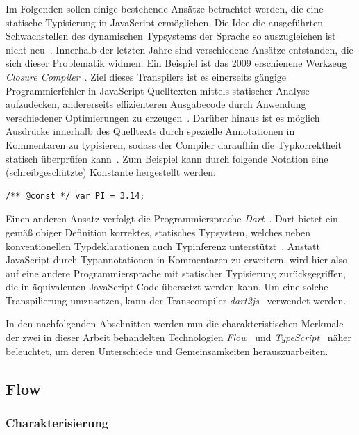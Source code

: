 Im Folgenden sollen einige bestehende Ansätze betrachtet werden, die eine statische Typisierung in JavaScript ermöglichen. Die Idee die ausgeführten Schwachstellen des dynamischen Typsystems der Sprache so auszugleichen ist nicht neu~\autocite[2]{FLOW:PAPER}. Innerhalb der letzten Jahre sind verschiedene Ansätze entstanden, die sich dieser Problematik widmen.
Ein Beispiel ist das 2009 erschienene Werkzeug \textit{Closure Compiler}~\autocite{CLOSURE:COMPILER}. Ziel dieses Transpilers ist es einerseits gängige Programmierfehler in JavaScript-Quelltexten mittels statischer Analyse aufzudecken, andererseits effizienteren Ausgabecode durch Anwendung verschiedener Optimierungen zu erzeugen~\autocite{CLOSURE:COMPILER}. Darüber hinaus ist es möglich Ausdrücke innerhalb des Quelltexts durch spezielle Annotationen in Kommentaren zu typisieren, sodass der Compiler daraufhin die Typkorrektheit statisch überprüfen kann~\autocite{CLOSURE:TYPES}. Zum Beispiel kann durch folgende Notation eine (schreibgeschützte) Konstante hergestellt werden:

\begin{lstlisting}[numbers=none]
/** @const */ var PI = 3.14;
\end{lstlisting}

Einen anderen Ansatz verfolgt die Programmiersprache \textit{Dart}~\autocite{DART:SPEC}. Dart bietet ein gemäß obiger Definition korrektes, statisches Typsystem, welches neben konventionellen Typdeklarationen auch Typinferenz unterstützt~\autocite{DART:TYPE_SYSTEM}. Anstatt JavaScript durch Typannotationen in Kommentaren zu erweitern, wird hier also auf eine andere Programmiersprache mit statischer Typisierung zurückgegriffen, die in äquivalenten JavaScript-Code übersetzt werden kann. Um eine solche Transpilierung umzusetzen, kann der Transcompiler \textit{dart2js}~\autocite{DART:DART2JS} verwendet werden.

In den nachfolgenden Abschnitten werden nun die charakteristischen Merkmale der zwei in dieser Arbeit behandelten Technologien \textit{Flow}~\autocite{FLOW:PAPER} und \textit{TypeScript}~\autocite{TYPESCRIPT:SPEC} näher beleuchtet, um deren Unterschiede und Gemeinsamkeiten herauszuarbeiten.

\subsection{Flow}
\label{subsec:flow}

\subsubsection{Charakterisierung}

